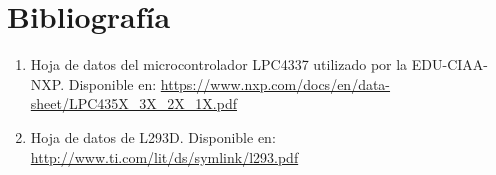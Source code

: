\chapter{Bibliografía}

\begin{enumerate}
	\item Hoja de datos del microcontrolador LPC4337 utilizado por la EDU-CIAA-NXP. Disponible en: \url{https://www.nxp.com/docs/en/data-sheet/LPC435X_3X_2X_1X.pdf}
	\item Hoja de datos de L293D. Disponible en: \url{http://www.ti.com/lit/ds/symlink/l293.pdf}
	
\end{enumerate}